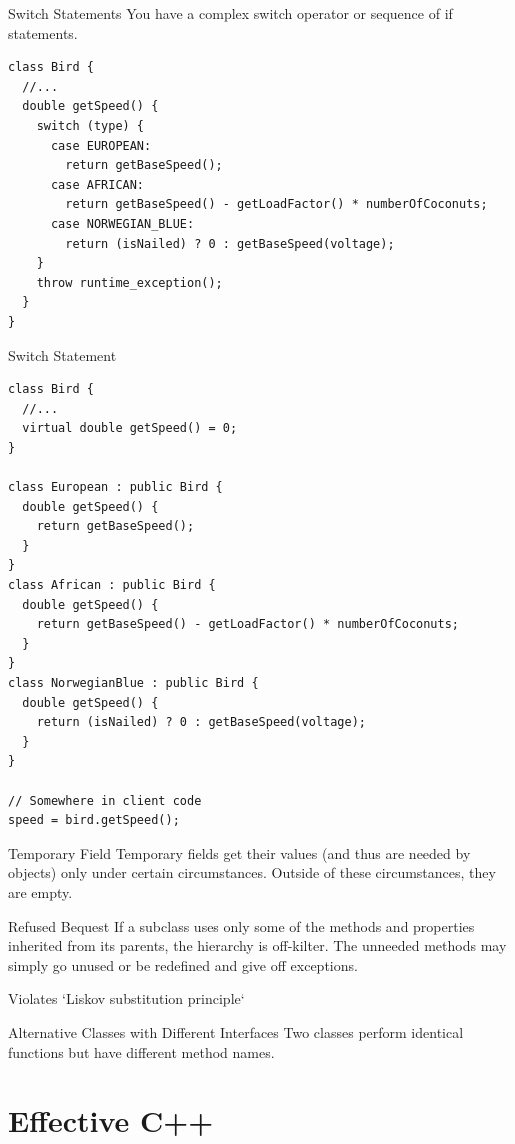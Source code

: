 \documentclass{beamer}
\begin{document}
\begin{frame}[fragile]{Switch Statements}
You have a complex switch operator or sequence of if statements.

\begin{lstlisting}
class Bird {
  //...
  double getSpeed() {
    switch (type) {
      case EUROPEAN:
        return getBaseSpeed();
      case AFRICAN:
        return getBaseSpeed() - getLoadFactor() * numberOfCoconuts;
      case NORWEGIAN_BLUE:
        return (isNailed) ? 0 : getBaseSpeed(voltage);
    }
    throw runtime_exception();
  }
}
\end{lstlisting}
\end{frame}

\begin{frame}[fragile]{Switch Statement}
\begin{lstlisting}
class Bird {
  //...
  virtual double getSpeed() = 0;
}

class European : public Bird {
  double getSpeed() {
    return getBaseSpeed();
  }
}
class African : public Bird {
  double getSpeed() {
    return getBaseSpeed() - getLoadFactor() * numberOfCoconuts;
  }
}
class NorwegianBlue : public Bird {
  double getSpeed() {
    return (isNailed) ? 0 : getBaseSpeed(voltage);
  }
}

// Somewhere in client code
speed = bird.getSpeed();
\end{lstlisting}
\end{frame}

\begin{frame}{Temporary Field}
Temporary fields get their values (and thus are needed by objects) only under
certain circumstances. Outside of these circumstances, they are empty.
\end{frame}

\begin{frame}{Refused Bequest}
If a subclass uses only some of the methods and properties inherited from its
parents, the hierarchy is off-kilter. The unneeded methods may simply go unused
or be redefined and give off exceptions.

Violates `Liskov substitution principle` 
\end{frame}

\begin{frame}{Alternative Classes with Different Interfaces}
Two classes perform identical functions but have different method names.
\end{frame}

\section{Effective C++}
\end{document}
